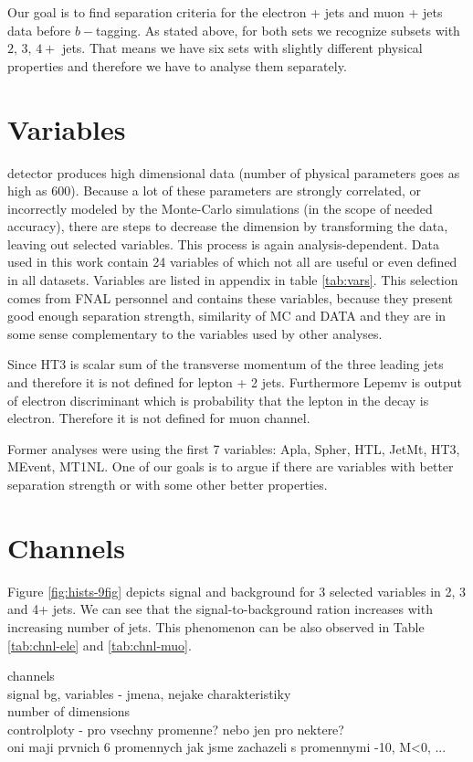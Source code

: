 Our goal is to find separation criteria for the electron + jets and muon + jets data before $b-$tagging. As stated above, for both sets we recognize subsets with $2, \,3,\, 4+$ jets. That means we have six sets with slightly different physical properties and therefore we have to analyse them separately. 

\section{Variables}

\dzero detector  produces high dimensional data (number of physical parameters  goes as high as $600$). Because a lot of these parameters are strongly correlated, or incorrectly modeled by the Monte-Carlo simulations (in the scope of needed accuracy), there are steps to decrease the dimension by transforming the data, leaving out selected variables. This process is again analysis-dependent. Data used in this work contain 24 variables of which not all are useful or even defined in all datasets. Variables are listed in appendix in table \ref{tab:vars}. This selection comes from  FNAL personnel and contains these variables, because they present good enough separation strength, similarity of MC and DATA and they are in some sense complementary to the variables used by other analyses.

Since \textsf{HT3} is scalar sum of the transverse momentum of the three leading jets and therefore it is not defined for lepton + 2 jets. Furthermore \textsf{Lepemv} is output of electron discriminant which is probability that the lepton in the decay is electron. Therefore it is not defined for muon channel. 

Former analyses were using the first 7 variables: \textsf{Apla, Spher, HTL, JetMt, HT3, MEvent, MT1NL}. One of our goals is to argue if there are variables with better separation strength or with some other better properties. 

\section{Channels}


Figure \ref{fig:hists-9fig} depicts signal and background for 3 selected variables in 2, 3 and 4+ jets. We can see that the signal-to-background ration increases with increasing number of jets. This phenomenon  can be also observed in Table \ref{tab:chnl-ele} and \ref{tab:chnl-muo}. 

channels \\
signal bg,
variables - jmena, nejake charakteristiky \\
number of dimensions \\
controlploty - pro vsechny promenne? nebo jen pro nektere?\\
oni maji prvnich 6 promennych
jak jsme zachazeli s promennymi -10, M<0, ...
